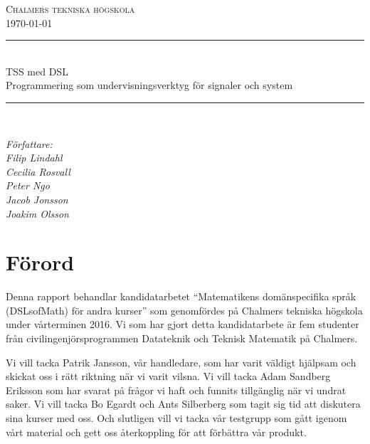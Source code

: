 \documentclass[]{article}
\date{\today}
\begin{document}
\begin{titlepage} \newcommand{\HRule}{\rule{\linewidth}{0.3mm}}
  \center
  \textsc{\Large Chalmers tekniska högskola}\\[0.05cm]
  \normalsize \today

  \HRule \\[0.08cm]
  { \large TSS med DSL
    \\
    \normalsize{Programmering som undervisningsverktyg för signaler och system}
  } \\[0.08cm] %
  \HRule \\[0.3cm]

  \vfill

  \begin{flushleft}
    \small
    \emph{Författare:\\
      \quad Filip Lindahl\\
      \quad Cecilia Rosvall\\
      \quad Peter Ngo\\
      \quad Jacob Jonsson\\
      \quad Joakim Olsson\\}
  \end{flushleft}
\end{titlepage}
\newpage

\setlength{\parskip}{2mm}
\setlength{\parindent}{0pt}

\section*{Förord}
Denna rapport behandlar kandidatarbetet ``Matematikens domänspecifika språk
(DSLsofMath) för andra kurser'' som genomfördes på Chalmers tekniska högskola
 under vårterminen 2016. Vi som har gjort detta kandidatarbete är fem studenter
från civilingenjörsprogrammen Datateknik och Teknisk Matematik på Chalmers.

Vi vill tacka Patrik Jansson, vår handledare, som har varit väldigt hjälpsam
och skickat oss i rätt riktning när vi varit vilsna. Vi vill tacka Adam Sandberg Eriksson
som har svarat på frågor vi haft och funnits tillgänglig när vi undrat saker. Vi
vill tacka Bo Egardt och Ants Silberberg som tagit sig tid att diskutera sina
kurser med oss. Och slutligen vill vi tacka vår testgrupp som gått igenom vårt
material och gett oss återkoppling för att förbättra vår produkt.

\newpage
\end{document}
